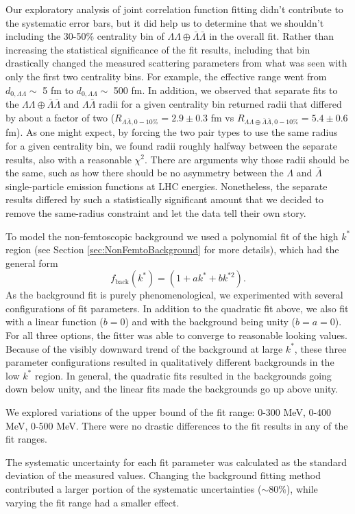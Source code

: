 Our exploratory analysis of joint correlation function fitting didn't contribute to the systematic error bars, but it did help us to determine that  we shouldn't including the 30-50\% centrality bin of $\Lambda\Lambda\oplus\bar{\Lambda}\bar{\Lambda}$ in the overall fit.
Rather than increasing the statistical significance of the fit results, including that bin drastically changed the measured scattering parameters from what was seen with only the first two centrality bins.
For example, the effective range went from $d_{0,\Lambda\Lambda}\sim$ 5 fm to $d_{0,\Lambda\Lambda}\sim$ 500 fm.
In addition, we observed that separate fits to the $\Lambda\Lambda\oplus\bar{\Lambda}\bar{\Lambda}$ and $\Lambda\bar{\Lambda}$ radii for a given centrality bin returned radii that differed by about a factor of  two ($R_{\Lambda\bar{\Lambda},0-10\%} = 2.9 \pm 0.3$ fm vs $R_{\Lambda\Lambda\oplus\bar{\Lambda}\bar{\Lambda},0-10\%} = 5.4 \pm 0.6$ fm).
As one might expect, by forcing the two pair types to use the same radius for a given centrality bin, we found radii roughly halfway between the separate results, also with a reasonable $\chi^2$.
There are arguments why those radii should be the same, such as how there should be no asymmetry between the $\Lambda$ and $\bar{\Lambda}$ single-particle emission functions at LHC energies. 
Nonetheless, the separate results differed by such a statistically significant amount that we decided to remove the same-radius constraint and let the data tell their own story.

To model the non-femtoscopic background we used a polynomial fit of the high $k^*$ region (see Section \ref{sec:NonFemtoBackground} for more details), which had the general form 
\begin{equation}
f_{\mathrm{back}}(k^*) = (1 + ak^* + bk^{*2}).
\end{equation}
As the background fit is purely phenomenological, we experimented with several configurations of fit parameters.
In addition to the quadratic fit above, we also fit with a linear function ($b = 0$) and with the background being unity ($b = a = 0$).
For all three options, the fitter was able to converge to reasonable looking values.
Because of the visibly downward trend of the background at large $k^*$, these three parameter configurations resulted in qualitatively different backgrounds in the low $k^*$ region.
In general, the quadratic fits resulted in the backgrounds going down below unity, and the linear fits made the backgrounds go up above unity.

We explored variations of the upper bound of the fit range: 0-300 MeV, 0-400 MeV, 0-500 MeV.
There were no drastic differences to the fit results in any of the fit ranges.

The systematic uncertainty for each fit parameter was calculated as the standard deviation of the measured values.
Changing the background fitting method contributed a larger portion of the systematic uncertainties ($\sim 80\%$), while varying the fit range had a smaller effect.
